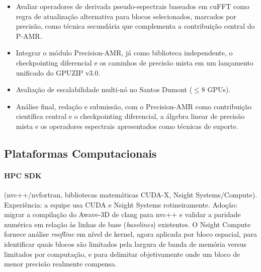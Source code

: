 \documentclass[12pt,a4paper]{article}
\newcommand{\pamr}{P\nobreakdash-AMR}
\begin{document}
\begin{itemize}
  \item Avaliar operadores de derivada pseudo-espectrais baseados em
        cuFFT como regra de atualização alternativa para blocos
        selecionados, marcados por precisão, como técnica secundária que
        complementa a contribuição central do \pamr{}.
  \item Integrar o módulo Precision-AMR, já como biblioteca
        independente, o checkpointing diferencial e os caminhos de
        precisão mista em um lançamento unificado do GPUZIP v3.0.
  \item Avaliação de escalabilidade multi-nó no Santos Dumont
        ($\leq$8 GPUs).
  \item Análise final, redação e submissão, com o Precision-AMR como
        contribuição científica central e o checkpointing diferencial, a
        álgebra linear de precisão mista e os operadores espectrais
        apresentados como técnicas de suporte.
\end{itemize}

\subsection{Plataformas Computacionais}

\paragraph{HPC SDK} (nvc++/nvfortran, bibliotecas matemáticas CUDA-X, Nsight
Systems/Compute). Experiência: a equipe usa CUDA e Nsight Systems
rotineiramente. Adoção: migrar a compilação do Awave-3D de clang para nvc++ e
validar a paridade numérica em relação às linhas de base (\emph{baselines})
existentes. O Nsight Compute fornece análise \emph{roofline} em nível de
kernel, agora aplicada por bloco espacial, para identificar quais blocos são
limitados pela largura de banda de memória versus limitados por computação, e
para delimitar objetivamente onde um bloco de menor precisão realmente
compensa.
\end{document}
